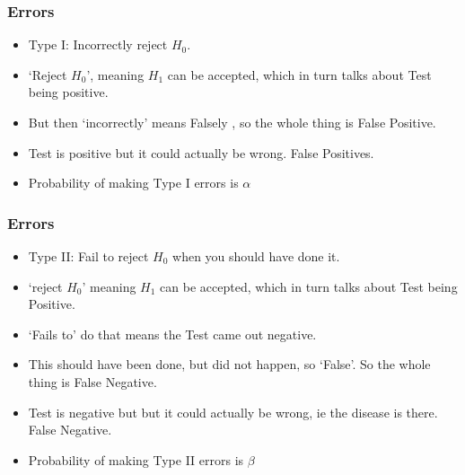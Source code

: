 \begin{frame}[fragile]\frametitle{Errors}
\begin{itemize}
\item Type I: Incorrectly reject $H_0$. 
\item `Reject $H_0$', meaning $H_1$ can be accepted, which in turn talks about Test being positive.
\item But then `incorrectly' means Falsely , so the whole thing is False Positive.
\item Test is positive but it could actually be wrong. False Positives.
\item Probability of making Type I errors is $\alpha$
\end{itemize}
\end{frame}

\begin{frame}[fragile]\frametitle{Errors}
\begin{itemize}
\item Type II: Fail to reject $H_0$ when you should have done it. 
\item `reject $H_0$' meaning $H_1$ can be accepted, which in turn talks about Test being Positive.
\item `Fails to' do that means the Test came out negative. 
\item This should have been done, but did not happen, so `False'. So the whole thing is False Negative.
\item Test is negative but but it could actually be wrong, ie the disease is there. False Negative.
\item Probability of making Type II errors is $\beta$
\end{itemize}
\end{frame}




